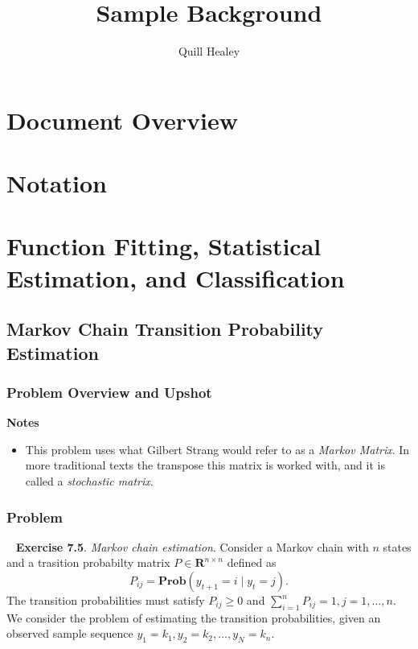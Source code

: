 \documentclass[12pt,reqno]{article}
\title{Sample Background}
\author{Quill Healey}
\theoremstyle{definition}
\numberwithin{equation}{section}
\begin{document}
\maketitle
\tableofcontents

\section*{Document Overview}


\section*{Notation}

\newpage

\section{Function Fitting, Statistical Estimation, and Classification}

\subsection{Markov Chain Transition Probability Estimation}

\subsubsection*{Problem Overview and Upshot}

\textbf{Notes}
\begin{itemize}
    \item This problem uses what Gilbert Strang would refer to as a \textit{Markov Matrix}. In 
    more traditional texts the transpose this matrix is worked with, and it is called a \textit{stochastic matrix}.
\end{itemize}

\subsubsection*{Problem}
~\cite{boyd_convex_optimization} \textbf{Exercise 7.5}. \textit{Markov chain estimation}. Consider a Markov chain
with $n$ states and a trasition probabilty matrix $P \in \mathbf{R}^{n \times n}$ defined as
\[P_{ij} = \mathbf{Prob}\left(y_{t+1} = i \mid y_t = j\right).\]
The transition probabilities must satisfy $P_{i j} \geq 0$ and $\sum_{i=1}^n P_{i j}=1, j=1, \ldots, n$. We consider the problem of estimating the transition probabilities,
given an observed sample sequence $y_1=k_1, y_2=k_2, \ldots, y_N=k_n$.
\end{document}
